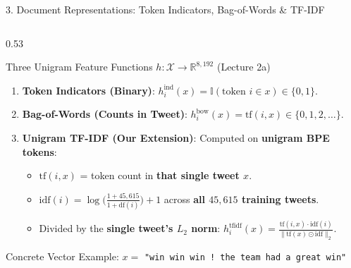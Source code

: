\documentclass[aspectratio=169, 9pt]{beamer}
\begin{document}
\begin{frame}{3. Document Representations: Token Indicators, Bag-of-Words \& TF-IDF}
\vspace{-2mm}
\begin{columns}[T, onlytextwidth]
  \begin{column}{0.53\textwidth}
    \begin{block}{Three Unigram Feature Functions $h: \mathcal{X} \to \mathbb{R}^{8,192}$ (Lecture 2a)}
      \scriptsize
      \begin{enumerate}\setlength{\itemsep}{1pt}
        \item \textbf{Token Indicators (Binary)}: $h_i^{\text{ind}}(x) = \mathbb{I}(\text{token } i \in x) \in \{0, 1\}$.
        \item \textbf{Bag-of-Words (Counts in Tweet)}: $h_i^{\text{bow}}(x) = \text{tf}(i, x) \in \{0, 1, 2, \dots\}$.
        \item \textbf{Unigram TF-IDF (Our Extension)}: Computed on \textbf{unigram BPE tokens}:
        \begin{itemize}\scriptsize\setlength{\itemsep}{0pt}
          \item $\text{tf}(i, x)$ = token count in \textbf{that single tweet $x$}.
          \item $\text{idf}(i) = \log\!\big(\frac{1 + 45,615}{1 + \text{df}(i)}\big) + 1$ across \textbf{all $45,615$ training tweets}.
          \item Divided by the \textbf{single tweet's $L_2$ norm}: $h_i^{\text{tfidf}}(x) = \frac{\text{tf}(i,x)\cdot\text{idf}(i)}{\|\text{tf}(x)\odot\text{idf}\|_2}$.
        \end{itemize}
      \end{enumerate}
    \end{block}
    \vspace{-2mm}
    \begin{exampleblock}{Concrete Vector Example: $x =$ \texttt{"win win win ! the team had a great win"}}
      \scriptsize
      \centering
      \renewcommand{\arraystretch}{1.0}
\end{exampleblock}
\end{column}
\end{columns}
\end{frame}
\end{document}
